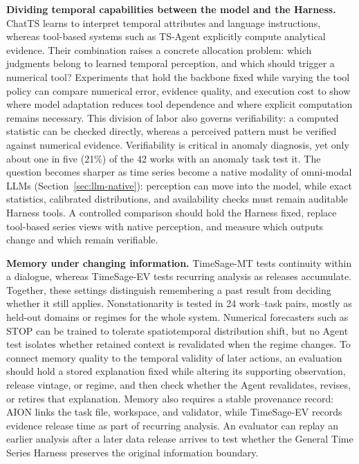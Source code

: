 \documentclass[preprints,article,submit,moreauthors]{Definitions/mdpi}
\begin{document}
\noindent\textbf{Dividing temporal capabilities between the model and the Harness.} ChatTS \citep{chatts2025} learns to interpret temporal attributes and language instructions, whereas tool-based systems such as TS-Agent \citep{tsagent2025} explicitly compute analytical evidence. Their combination raises a concrete allocation problem: which judgments belong to learned temporal perception, and which should trigger a numerical tool? Experiments that hold the backbone fixed while varying the tool policy can compare numerical error, evidence quality, and execution cost to show where model adaptation reduces tool dependence and where explicit computation remains necessary. This division of labor also governs verifiability: a computed statistic can be checked directly, whereas a perceived pattern must be verified against numerical evidence. Verifiability is critical in anomaly diagnosis, yet only about one in five (21\%) of the 42 works with an anomaly task test it. The question becomes sharper as time series become a native modality of omni-modal LLMs (Section~\ref{sec:llm-native}): perception can move into the model, while exact statistics, calibrated distributions, and availability checks must remain auditable Harness tools. A controlled comparison should hold the Harness fixed, replace tool-based series views with native perception, and measure which outputs change and which remain verifiable.

\noindent\textbf{Memory under changing information.} TimeSage-MT \citep{timesagemt2026} tests continuity within a dialogue, whereas TimeSage-EV \citep{timesageev2026} tests recurring analysis as releases accumulate. Together, these settings distinguish remembering a past result from deciding whether it still applies. Nonstationarity is tested in 24 work--task pairs, mostly as held-out domains or regimes for the whole system. Numerical forecasters such as STOP \citep{ma2025robust} can be trained to tolerate spatiotemporal distribution shift, but no Agent test isolates whether retained context is revalidated when the regime changes. To connect memory quality to the temporal validity of later actions, an evaluation should hold a stored explanation fixed while altering its supporting observation, release vintage, or regime, and then check whether the Agent revalidates, revises, or retires that explanation. Memory also requires a stable provenance record: AION \citep{aion2026} links the task file, workspace, and validator, while TimeSage-EV \citep{timesageev2026} records evidence release time as part of recurring analysis. An evaluator can replay an earlier analysis after a later data release arrives to test whether the General Time Series Harness preserves the original information boundary.
\end{document}

